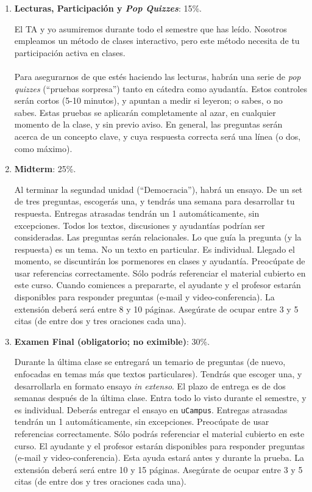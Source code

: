 \documentclass[letterpaper]{article}
\begin{document}
\begin{enumerate}

	\item {\bf Lecturas, Participaci\'on y \emph{Pop Quizzes}}: 15\%.

		El TA y yo asumiremos durante todo el semestre que has le\'ido. Nosotros empleamos un m\'etodo de clases interactivo, pero este m\'etodo necesita de tu participaci\'on activa en clases.
		\\
		\\	
		Para asegurarnos de que est\'es haciendo las lecturas, habr\'an una serie de \emph{pop quizzes} (``pruebas sorpresa'') tanto en c\'atedra como ayudant\'ia. Estos controles ser\'an cortos (5-10 minutos), y apuntan a medir si leyeron; o sabes, o no sabes. Estas pruebas se aplicar\'an completamente al azar, en cualquier momento de la clase, y sin previo aviso. En general, las preguntas ser\'an acerca de un concepto clave, y cuya respuesta correcta ser\'a una l\'inea (o dos, como m\'aximo).

	\item {\bf Midterm}: 25\%.

		Al terminar la segundad unidad (``Democracia''), habr\'a un ensayo. De un set de tres preguntas, escoger\'as una, y tendr\'as una semana para desarrollar tu respuesta. Entregas atrasadas tendr\'an un 1 autom\'aticamente, sin excepciones. Todos los textos, discusiones y ayudant\'ias podr\'ian ser consideradas. Las preguntas ser\'an relacionales. Lo que gu\'ia la pregunta (y la respuesta) es un tema. No un texto en particular. Es individual. Llegado el momento, se discuntir\'an los pormenores en clases y ayudant\'ia. Preoc\'upate de usar referencias correctamente. S\'olo podr\'as referenciar el material cubierto en este curso. Cuando comiences a prepararte, el ayudante y el profesor estar\'an disponibles para responder preguntas (e-mail y video-conferencia). La extensi\'on deber\'a ser\'a entre 8 y 10 p\'aginas. Aseg\'urate de ocupar entre 3 y 5 citas (de entre dos y tres oraciones cada una).

	\item {\bf Examen Final (obligatorio; no eximible)}: 30\%. 

	Durante la \'ultima clase se entregar\'a un temario de preguntas (de nuevo, enfocadas en temas m\'as que textos particulares). Tendr\'as que escoger una, y desarrollarla en formato ensayo \emph{in extenso}. El plazo de entrega es de dos semanas despu\'es de la \'ultima clase. Entra todo lo visto durante el semestre, y es individual. Deber\'as entregar el ensayo en \texttt{uCampus}. Entregas atrasadas tendr\'an un 1 autom\'aticamente, sin excepciones. Preoc\'upate de usar referencias correctamente. S\'olo podr\'as referenciar el material cubierto en este curso. El ayudante y el profesor estar\'an disponibles para responder preguntas (e-mail y video-conferencia). Esta ayuda estar\'a antes y durante la prueba. La extensi\'on deber\'a ser\'a entre 10 y 15 p\'aginas. Aseg\'urate de ocupar entre 3 y 5 citas (de entre dos y tres oraciones cada una).






\end{enumerate}
\end{document}
